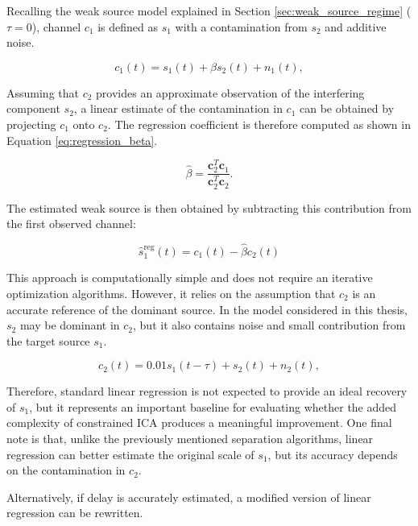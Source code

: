 Recalling the weak source model explained in Section \ref{sec:weak_source_regime} ($\tau=0$), channel $c_1$ is defined as $s_1$ with a contamination from $s_2$ and additive noise.

\begin{equation}
    c_1(t) = s_1(t) + \beta s_2(t) + n_1(t),
\end{equation}

Assuming that $c_2$ provides an approximate observation of the interfering component $s_2$, a linear estimate of the contamination in $c_1$ can be obtained by projecting $c_1$ onto $c_2$. The regression coefficient is therefore computed as shown in Equation \ref{eq:regression_beta}.

\begin{equation}
    \hat{\beta} =
    \frac{\mathbf{c}_2^T \mathbf{c}_1}
    {\mathbf{c}_2^T \mathbf{c}_2}.
    \label{eq:regression_beta}
\end{equation}

The estimated weak source is then obtained by subtracting this contribution from the first observed channel:

\begin{equation}
    \hat{s}_1^{\mathrm{reg}}(t) =
    c_1(t) - \hat{\beta}c_2(t)
    \label{eq:regression_s1}
\end{equation}

This approach is computationally simple and does not require an iterative optimization algorithms. However, it relies on the assumption that $c_2$ is an accurate reference of the dominant source. In the model considered in this thesis, $s_2$ may be dominant in $c_2$, but it also contains noise and small contribution from the target source $s_1$.

\begin{equation}
    c_2(t) = 0.01s_1(t-\tau) + s_2(t) + n_2(t),
\end{equation}

Therefore, standard linear regression is not expected to provide an ideal recovery of $s_1$, but it represents an important baseline for evaluating whether the added complexity of constrained ICA produces a meaningful improvement. One final note is that, unlike the previously mentioned separation algorithms, linear regression can better estimate the original scale of $s_1$, but its accuracy depends on the contamination in $c_2$. 

Alternatively, if delay is accurately estimated, a modified version of linear regression can be rewritten. 

